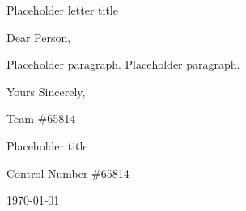 \documentclass[12pt]{report}
\newcommand{\teamnumber}{65814}
\begin{document}
\begin{center}
{\Large Placeholder letter title}
\end{center}

Dear Person,

{
  \setlength\parindent{36pt}

  Placeholder paragraph.
  Placeholder paragraph.
}
  
Yours Sincerely,

\qquad Team \#\teamnumber

\eject


\vspace*{\fill}
\begin{centering}
{\Huge Placeholder title \\[30pt] }

{\LARGE Control Number \#\teamnumber \\[14pt]}

{\LARGE \today}

\end{centering}
\vspace*{\fill}

\eject


\tableofcontents
\thispagestyle{fancy}

\eject


\setlength\parindent{36pt}

\end{document}
